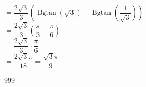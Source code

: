 \documentclass[a4paper]{article}
\begin{document}
$= \dfrac{2\sqrt{3}}{3} \left(\operatorname{Bgtan} (\sqrt{3}) -  \operatorname{Bgtan} \left(\dfrac{1}{\sqrt{3}}\right)\right) $\\

$= \dfrac{2\sqrt{3}}{3} \left(\dfrac{\pi}{3} - \dfrac{\pi}{6}\right)$\\

$= \dfrac{2\sqrt{3}}{3}\cdot\dfrac{\pi}{6}$\\

$= \dfrac{2\sqrt{3}\pi}{18} = \dfrac{\sqrt{3}\pi}{9}$\\


















\begin{thebibliography}{999}
\end{thebibliography}
\end{document}
